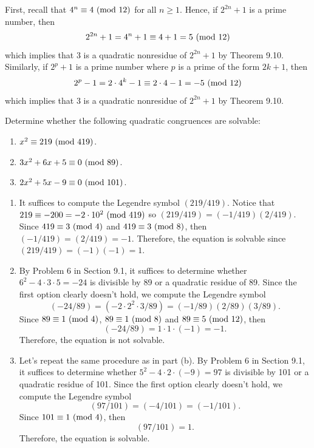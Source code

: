\begin{solution}
    First, recall that $4^n \equiv 4 \ (\mathrm{mod}\ 12)$ for all $n \geq 1$. Hence, if $2^{2n} + 1$ is a prime number, then
    $$2^{2n} + 1 = 4^n + 1 \equiv 4 + 1 = 5 \ (\mathrm{mod}\ 12)$$
    which implies that 3 is a quadratic nonresidue of $2^{2n} + 1$ by Theorem 9.10. Similarly, if $2^p + 1$ is a prime number where $p$ is a prime of the form $2k+1$, then
    $$2^p - 1 = 2\cdot 4^k - 1 \equiv 2\cdot 4 - 1 = -5 \ (\mathrm{mod}\ 12)$$ 
    which implies that 3 is a quadratic nonresidue of $2^{2n} + 1$ by Theorem 9.10. \\
\end{solution}

\begin{exercise}
    Determine whether the following quadratic congruences are solvable:
    \begin{enumerate}
        \item $x^2 \equiv 219 \ (\mathrm{mod}\ 419)$.
        \item $3x^2 + 6x + 5 \equiv 0 \ (\mathrm{mod}\ 89)$.
        \item $2x^2 + 5x - 9 \equiv 0 \ (\mathrm{mod}\ 101)$. \\
    \end{enumerate}
\end{exercise}

\begin{solution}
    \begin{enumerate}
        \item It suffices to compute the Legendre symbol $(219/419)$. Notice that $219 \equiv -200 = -2 \cdot 10^2 \ (\mathrm{mod}\ 419)$ so $(219/419) = (-1/419)(2/419)$. Since $419 \equiv 3 \ (\mathrm{mod}\ 4)$ and $419 \equiv 3 \ (\mathrm{mod}\ 8)$, then $(-1/419) = (2/419) = -1$. Therefore, the equation is solvable since $(219/419) = (-1)(-1) = 1$.
        \item By Problem 6 in Section 9.1, it suffices to determine whether $6^2 - 4\cdot 3 \cdot 5 = -24$ is divisible by 89 or a quadratic residue of 89. Since the first option clearly doesn't hold, we compute the Legendre symbol
        $$(-24/89) = (-2\cdot 2^2 \cdot 3/89) = (-1/89)(2/89)(3/89).$$
        Since $89 \equiv 1 \ (\mathrm{mod}\ 4)$, $89 \equiv 1 \ (\mathrm{mod}\ 8)$ and $89 \equiv 5 \ (\mathrm{mod}\ 12)$, then 
        $$(-24/89) = 1\cdot 1\cdot (-1) = -1.$$
        Therefore, the equation is not solvable. 
        \item Let's repeat the same procedure as in part (b). By Problem 6 in Section 9.1, it suffices to determine whether $5^2 - 4\cdot 2 \cdot (-9) = 97$ is divisible by 101 or a quadratic residue of 101. Since the first option clearly doesn't hold, we compute the Legendre symbol
        $$(97/101) = (-4/101) = (-1/101).$$
        Since $101 \equiv 1 \ (\mathrm{mod}\ 4)$, then 
        $$(97/101) = 1.$$
        Therefore, the equation is solvable.  \\
    \end{enumerate}
\end{solution}

